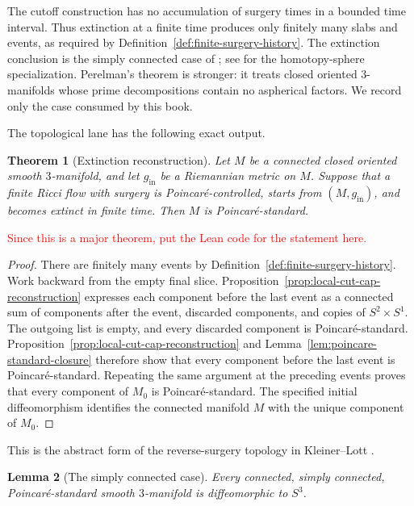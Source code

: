 \documentclass[10pt]{coll-l}
\newtheorem{theorem}{Theorem}[chapter]
\newtheorem{lemma}[theorem]{Lemma}
\theoremstyle{definition}
\theoremstyle{remark}
\numberwithin{section}{chapter}
\numberwithin{equation}{chapter}
\begin{document}
The cutoff construction has no accumulation of surgery times in a bounded
time interval.  Thus extinction at a finite time produces only finitely many
slabs and events, as required by
Definition~\ref{def:finite-surgery-history}.  The extinction conclusion is
the simply connected case of \cite[Theorem~1.1]{Perelman3}; see
\cite[\S1.4]{Perelman3} for the homotopy-sphere specialization.  Perelman's
theorem is stronger: it treats closed oriented $3$-manifolds whose prime
decompositions contain no aspherical factors.  We record only the case
consumed by this book.

The topological lane has the following exact output.

\begin{theorem}[Extinction reconstruction]
\label{thm:extinction-reconstruction}
Let $M$ be a connected closed oriented smooth $3$-manifold, and let
$g_{\mathrm{in}}$ be a Riemannian metric on $M$.  Suppose that a finite Ricci
flow with surgery is Poincar\'e-controlled, starts from
$(M,g_{\mathrm{in}})$, and becomes extinct in finite time.  Then $M$ is
Poincar\'e-standard.
\end{theorem}

\textcolor{red}{Since this is a major theorem, put the Lean code for the statement here.}

\begin{proof}
There are finitely many events by
Definition~\ref{def:finite-surgery-history}.  Work backward from the empty
final slice.  Proposition~\ref{prop:local-cut-cap-reconstruction} expresses
each component before the last event as a connected sum of components after
the event, discarded components, and copies of $S^{2}\times S^{1}$.  The
outgoing list is empty, and every discarded component is
Poincar\'e-standard.  Proposition~\ref{prop:local-cut-cap-reconstruction}
and Lemma~\ref{lem:poincare-standard-closure} therefore show that every
component before the last event is Poincar\'e-standard.  Repeating the same
argument at the preceding events proves that every component of $M_0$ is
Poincar\'e-standard.  The specified initial diffeomorphism identifies the
connected manifold $M$ with the unique component of $M_0$.
\end{proof}

This is the abstract form of the reverse-surgery topology in
Kleiner--Lott \cite[Lemmas~73.4 and~81.2]{MR2460872}.

\begin{lemma}[The simply connected case]
\label{lem:simply-connected-standard}
Every connected, simply connected, Poincar\'e-standard smooth
$3$-manifold is diffeomorphic to $S^{3}$.
\end{lemma}
\end{document}
